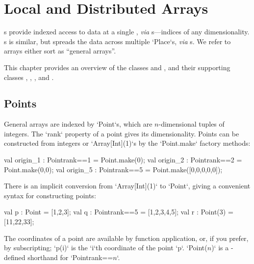 \chapter{Local and Distributed Arrays}\label{XtenArrays}

s provide indexed access to data at a single , {\em via}
s---indices of any dimensionality. s is similar, but
spreads the data across multiple \xcd`Place`s, {\em via} s.  
We refer to arrays either sort as ``general arrays''.  


This chapter provides an overview of the  classes 
and , and their supporting classes , 
, 
, 
and .  


\section{Points}\label{point-syntax}


General arrays are indexed by \xcd`Point`s, which are $n$-dimensional tuples of
integers.  The \xcd`rank`
property of a point gives its dimensionality.  Points can be constructed from
integers or \xcd`Array[Int](1)`s by
the \xcd`Point.make` factory methods:
\begin{xten}
val origin_1 : Point{rank==1} = Point.make(0);
val origin_2 : Point{rank==2} = Point.make(0,0);
val origin_5 : Point{rank==5} = Point.make([0,0,0,0,0]);
\end{xten}

There is an implicit conversion from \xcd`Array[Int](1)` to 
\xcd`Point`, giving
a convenient syntax for constructing points: 

\begin{xten}
val p : Point = [1,2,3];
val q : Point{rank==5} = [1,2,3,4,5];
val r : Point(3) = [11,22,33];
\end{xten}

The coordinates of a point are available by function application, or, if you
prefer, by subscripting; \xcd`p(i)` is the
\xcd`i`th coordinate of the point \xcd`p`. 
\xcdmath`Point($n$)` is a -defined shorthand  for 
\xcdmath`Point{rank==$n$}`.


